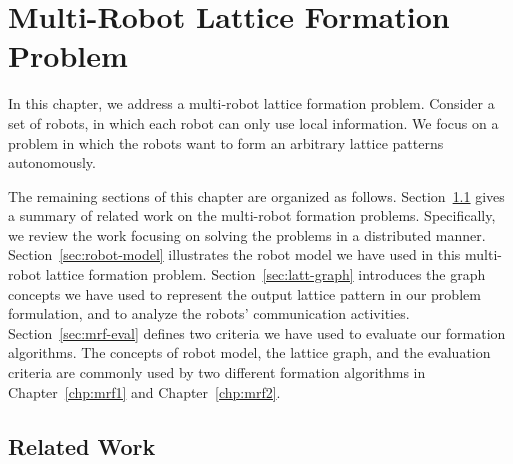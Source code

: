 \chapter{Multi-Robot Lattice Formation Problem}
\label{chp:mrf}

In this chapter, we address a multi-robot lattice formation problem.
%
Consider a set of robots, in which each
robot can only use local information.
We focus on a problem in which the robots want to form an arbitrary lattice patterns autonomously.


The remaining sections of this chapter are organized as follows. 
%
Section~\ref{sec:related-mrf} gives a summary of related work on the multi-robot formation problems.
%
Specifically, we review the work focusing on solving the problems in a distributed manner. 
%
Section~\ref{sec:robot-model} illustrates the robot model we have used in this multi-robot lattice formation problem.
%
Section~\ref{sec:latt-graph} introduces the graph concepts we have used to represent the output lattice pattern in our problem formulation, and to analyze the robots' communication activities. 
%
Section~\ref{sec:mrf-eval} defines two criteria we have used to evaluate our formation algorithms.
%
The concepts of robot model, the lattice graph, and the evaluation criteria are commonly used by two different formation algorithms in Chapter~\ref{chp:mrf1} and Chapter~\ref{chp:mrf2}.

\section{Related Work}
\label{sec:related-mrf}

